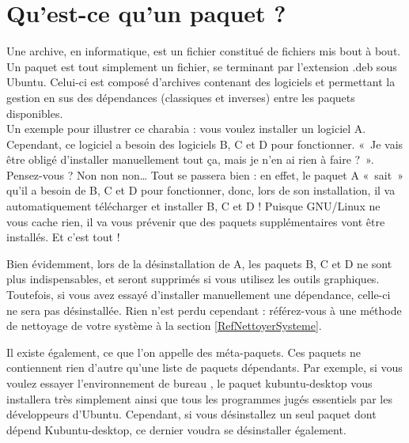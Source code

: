 {\section{Qu'est-ce qu'un paquet ?}
Une archive, en informatique, est un fichier constitué de fichiers mis bout à bout. Un paquet est tout simplement un fichier, se terminant par l'extension .deb sous Ubuntu. Celui-ci est composé d'archives contenant des logiciels et permettant la gestion en sus des dépendances (classiques et inverses) entre les paquets disponibles.\\
Un exemple pour illustrer ce charabia : vous voulez installer un logiciel A. Cependant, ce logiciel a besoin des logiciels B, C et D pour fonctionner. «~Je vais être obligé d'installer manuellement tout ça, mais je n'en ai rien à faire ?~». Pensez-vous ? Non non non\ldots{} Tout se passera bien : en effet, le paquet A «~sait~» qu'il a besoin de B, C et D pour fonctionner, donc, lors de son installation, il va automatiquement télécharger et installer B, C et D ! Puisque GNU/Linux ne vous cache rien, il va vous prévenir que des paquets supplémentaires vont être installés. Et c'est tout !\par
Bien évidemment, lors de la désinstallation de A, les paquets B, C et D ne sont plus indispensables, et seront supprimés si vous utilisez les outils graphiques. Toutefois, si vous avez essayé d'installer manuellement une dépendance, celle-ci ne sera pas désinstallée. Rien n'est perdu cependant : référez-vous à une méthode de nettoyage de votre système à la section \ref{RefNettoyerSysteme}. 
\begin{nota}
Il existe également, ce que l'on appelle des méta-paquets. Ces paquets ne contiennent rien d'autre qu'une liste de paquets dépendants. Par exemple, si vous voulez essayer l'environnement de bureau , le paquet kubuntu-desktop vous installera très simplement  ainsi que tous les programmes  jugés essentiels par les développeurs d'Ubuntu. Cependant, si vous désinstallez un seul paquet dont dépend Kubuntu-desktop, ce dernier voudra se désinstaller également.
\end{nota}
}
